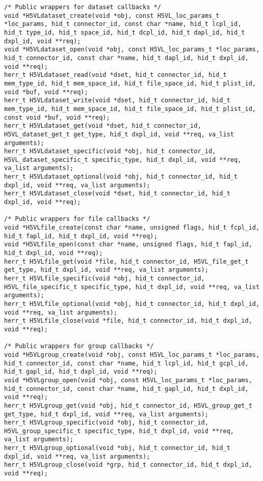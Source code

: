 \begin{appendices}
\begin{lstlisting}
/* Public wrappers for dataset callbacks */                                      
void *H5VLdataset_create(void *obj, const H5VL_loc_params_t *loc_params, hid_t connector_id, const char *name, hid_t lcpl_id, hid_t type_id, hid_t space_id, hid_t dcpl_id, hid_t dapl_id, hid_t dxpl_id, void **req);
void *H5VLdataset_open(void *obj, const H5VL_loc_params_t *loc_params, hid_t connector_id, const char *name, hid_t dapl_id, hid_t dxpl_id, void **req);
herr_t H5VLdataset_read(void *dset, hid_t connector_id, hid_t mem_type_id, hid_t mem_space_id, hid_t file_space_id, hid_t plist_id, void *buf, void **req);
herr_t H5VLdataset_write(void *dset, hid_t connector_id, hid_t mem_type_id, hid_t mem_space_id, hid_t file_space_id, hid_t plist_id, const void *buf, void **req);
herr_t H5VLdataset_get(void *dset, hid_t connector_id, H5VL_dataset_get_t get_type, hid_t dxpl_id, void **req, va_list arguments);
herr_t H5VLdataset_specific(void *obj, hid_t connector_id, H5VL_dataset_specific_t specific_type, hid_t dxpl_id, void **req, va_list arguments);
herr_t H5VLdataset_optional(void *obj, hid_t connector_id, hid_t dxpl_id, void **req, va_list arguments);
herr_t H5VLdataset_close(void *dset, hid_t connector_id, hid_t dxpl_id, void **req);

/* Public wrappers for file callbacks */                                         
void *H5VLfile_create(const char *name, unsigned flags, hid_t fcpl_id, hid_t fapl_id, hid_t dxpl_id, void **req);
void *H5VLfile_open(const char *name, unsigned flags, hid_t fapl_id, hid_t dxpl_id, void **req);
herr_t H5VLfile_get(void *file, hid_t connector_id, H5VL_file_get_t get_type, hid_t dxpl_id, void **req, va_list arguments);
herr_t H5VLfile_specific(void *obj, hid_t connector_id, H5VL_file_specific_t specific_type, hid_t dxpl_id, void **req, va_list arguments);
herr_t H5VLfile_optional(void *obj, hid_t connector_id, hid_t dxpl_id, void **req, va_list arguments);
herr_t H5VLfile_close(void *file, hid_t connector_id, hid_t dxpl_id, void **req);
                                                                                 
/* Public wrappers for group callbacks */                                        
void *H5VLgroup_create(void *obj, const H5VL_loc_params_t *loc_params, hid_t connector_id, const char *name, hid_t lcpl_id, hid_t gcpl_id, hid_t gapl_id, hid_t dxpl_id, void **req);
void *H5VLgroup_open(void *obj, const H5VL_loc_params_t *loc_params, hid_t connector_id, const char *name, hid_t gapl_id, hid_t dxpl_id, void **req);
herr_t H5VLgroup_get(void *obj, hid_t connector_id, H5VL_group_get_t get_type, hid_t dxpl_id, void **req, va_list arguments);
herr_t H5VLgroup_specific(void *obj, hid_t connector_id, H5VL_group_specific_t specific_type, hid_t dxpl_id, void **req, va_list arguments);
herr_t H5VLgroup_optional(void *obj, hid_t connector_id, hid_t dxpl_id, void **req, va_list arguments);
herr_t H5VLgroup_close(void *grp, hid_t connector_id, hid_t dxpl_id, void **req);


\end{lstlisting}
\end{appendices}
